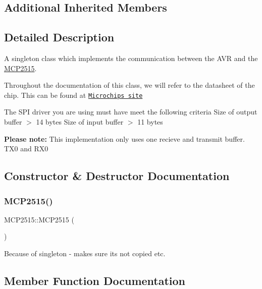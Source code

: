 \subsection*{Additional Inherited Members}


\subsection{Detailed Description}
A singleton class which implements the communication between the A\+VR and the \hyperlink{class_m_c_p2515}{M\+C\+P2515}. 

Throughout the documentation of this class, we will refer to the datasheet of the chip. This can be found at \href{http://ww1.microchip.com/downloads/en/DeviceDoc/21801G.pdf}{\tt Microchips site}

The S\+PI driver you are using must have meet the following criteria Size of output buffer $>$ 14 bytes  Size of input buffer $>$ 11 bytes 

{\bfseries Please note\+:} This implementation only uses one recieve and transmit buffer. T\+X0 and R\+X0 

\subsection{Constructor \& Destructor Documentation}
\hypertarget{class_m_c_p2515_a8cd4111604b740feb758bd4d077f4fb8}{}\label{class_m_c_p2515_a8cd4111604b740feb758bd4d077f4fb8} 
\subsubsection{\texorpdfstring{M\+C\+P2515()}{MCP2515()}}
{\footnotesize\ttfamily M\+C\+P2515\+::\+M\+C\+P2515 (\begin{DoxyParamCaption}\item[{const \hyperlink{class_m_c_p2515}{M\+C\+P2515} \&}]{ }\end{DoxyParamCaption})\hspace{0.3cm}{\ttfamily [delete]}}

Because of singleton -\/ makes sure its not copied etc. 

\subsection{Member Function Documentation}
\hypertarget{class_m_c_p2515_aa9a35fe139adf1fccaaceec561544c14}{}\label{class_m_c_p2515_aa9a35fe139adf1fccaaceec561544c14} 
